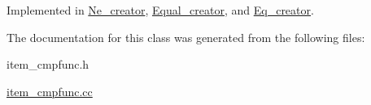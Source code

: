 Implemented in \mbox{\hyperlink{classNe__creator_a588788bd9c5388d4b11bd206690af928}{Ne\+\_\+creator}}, \mbox{\hyperlink{classEqual__creator_adce84c4bb7f90dd0aca3c2a0c4dd6f35}{Equal\+\_\+creator}}, and \mbox{\hyperlink{classEq__creator_ac63960f7bc029779aba59e9492663e2d}{Eq\+\_\+creator}}.



The documentation for this class was generated from the following files\+:\begin{DoxyCompactItemize}
\item 
item\+\_\+cmpfunc.\+h\item 
\mbox{\hyperlink{item__cmpfunc_8cc}{item\+\_\+cmpfunc.\+cc}}\end{DoxyCompactItemize}
